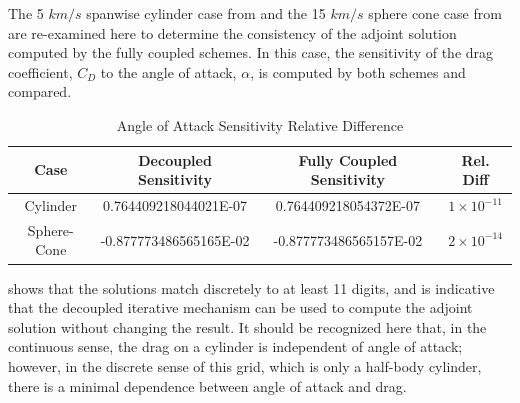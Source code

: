 The 5 $km/s$ spanwise cylinder case from  and the 15
$km/s$ sphere cone case from  are re-examined here
to determine the consistency of the adjoint solution computed by the fully
coupled schemes.  In this case, the sensitivity of the drag coefficient, $C_D$
to the angle of attack, $\alpha$, is computed by both schemes and compared.
\begin{table}[h]
  \centering
  \begin{tabular}{c|c|c|c}
    Case & Decoupled Sensitivity & Fully Coupled Sensitivity & Rel. Diff\\
    \hline
    Cylinder    &  0.764409218044021E-07 &  0.764409218054372E-07 & $1 \times 10^{-11}$ \\
    Sphere-Cone & -0.877773486565165E-02 & -0.877773486565157E-02 & $2 \times 10^{-14}$
  \end{tabular}
  \caption{Angle of Attack Sensitivity Relative Difference}
  \label{tab:cylinder-adj-diff}
\end{table}
 shows that the solutions match discretely to at
least 11 digits, and is indicative that the decoupled iterative mechanism can be
used to compute the adjoint solution without changing the result.  It should be
recognized here that, in the continuous sense, the drag on a cylinder is
independent of angle of attack; however, in the discrete sense of this grid,
which is only a half-body cylinder, there is a minimal dependence between angle
of attack and drag.

